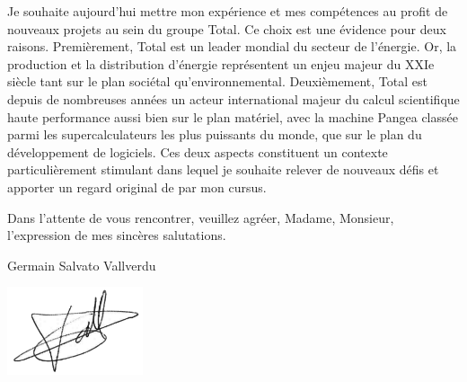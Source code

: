 \documentclass[11pt,a4paper,ragged2e]{../alta_letter}
\begin{document}
Je souhaite aujourd'hui mettre mon expérience et mes compétences au profit de nouveaux projets au sein du groupe Total. Ce choix est une évidence pour deux raisons. Premièrement, Total est un leader mondial du secteur de l'énergie. Or, la production et la distribution d'énergie représentent un enjeu majeur du XXIe siècle tant sur le plan sociétal qu'environnemental. Deuxièmement, Total est depuis de nombreuses années un acteur international majeur du calcul scientifique haute performance aussi bien sur le plan matériel, avec la machine Pangea classée parmi les supercalculateurs les plus puissants du monde, que sur le plan du développement de logiciels. Ces deux aspects constituent un contexte particulièrement stimulant dans lequel je souhaite relever de nouveaux défis et apporter un regard original de par mon cursus.

Dans l'attente de vous rencontrer, veuillez agréer, Madame, Monsieur, l'expression de mes sincères salutations.

\bigskip

\hspace{.6\textwidth}Germain Salvato Vallverdu

\hspace{.6\textwidth}\includegraphics[width=4cm]{../maSignature}
\end{document}
